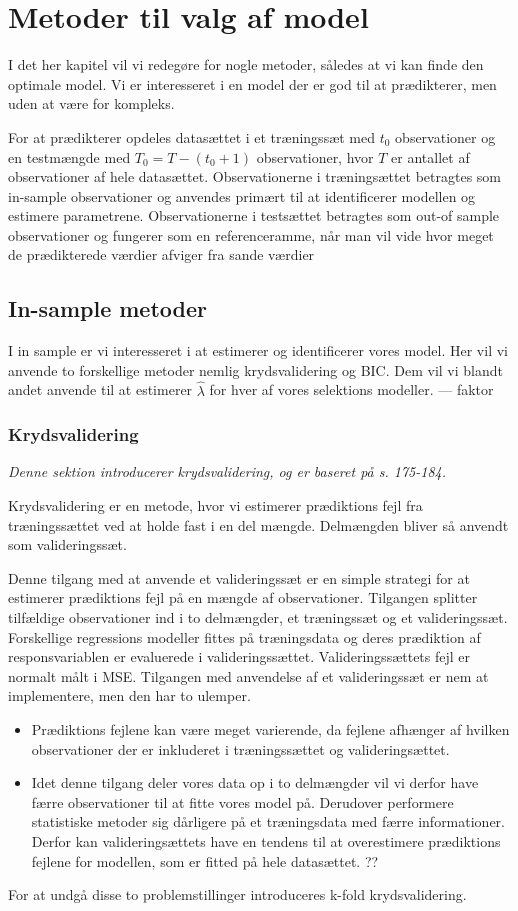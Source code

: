 \chapter{Metoder til valg af model}
I det her kapitel vil vi redegøre for nogle metoder, således at vi kan finde den optimale model.
Vi er interesseret i en model der er god til at prædikterer, men uden at være for kompleks.  

For at prædikterer opdeles datasættet i et træningssæt med $t_0$ observationer og en testmængde med $T_0 = T - (t_0 +1)$ observationer, hvor $T$ er antallet af observationer af hele datasættet. 
Observationerne i træningsættet betragtes som in-sample observationer og anvendes primært til at identificerer modellen og estimere parametrene. 
Observationerne i testsættet betragtes som out-of sample observationer og fungerer som en referenceramme, når man vil vide hvor meget de prædikterede værdier afviger fra sande værdier 
 
\section{In-sample metoder}
I in sample er vi interesseret i at estimerer og identificerer vores model. 
Her vil vi anvende to forskellige metoder nemlig krydsvalidering og  BIC. 
Dem vil vi blandt andet anvende til at estimerer $\widehat{\lambda}$ for hver af vores selektions modeller. --- faktor

\subsection{Krydsvalidering}
\textit{Denne sektion introducerer krydsvalidering, og er baseret på \citep{james} s. 175-184. }

Krydsvalidering er en metode, hvor vi estimerer prædiktions fejl fra træningssættet ved at holde fast i en del mængde. Delmængden bliver så anvendt som valideringssæt. 

Denne tilgang med at anvende et valideringssæt er en simple strategi for at estimerer prædiktions fejl på en mængde af observationer. 
Tilgangen splitter tilfældige observationer ind  i to delmængder, et træningssæt og et valideringssæt. 
Forskellige regressions modeller fittes på træningsdata og deres prædiktion af responsvariablen er evaluerede i valideringssættet. 
Valideringssættets fejl er normalt målt i MSE. 
Tilgangen med anvendelse af et valideringssæt er nem at implementere, men den har to ulemper. 
\begin{itemize}
\item Prædiktions fejlene kan være meget varierende, da fejlene afhænger af hvilken observationer der er inkluderet i træningssættet og valideringsættet. 
\item Idet denne tilgang deler vores data op i to delmængder vil vi derfor have færre observationer til at fitte vores model på. Derudover performere statistiske metoder sig dårligere på et træningsdata med færre informationer. Derfor kan valideringsættets have en tendens til at overestimere prædiktions fejlene for modellen, som er fitted på hele datasættet. ??
\end{itemize}
For at undgå disse to problemstillinger introduceres k-fold krydsvalidering. 


